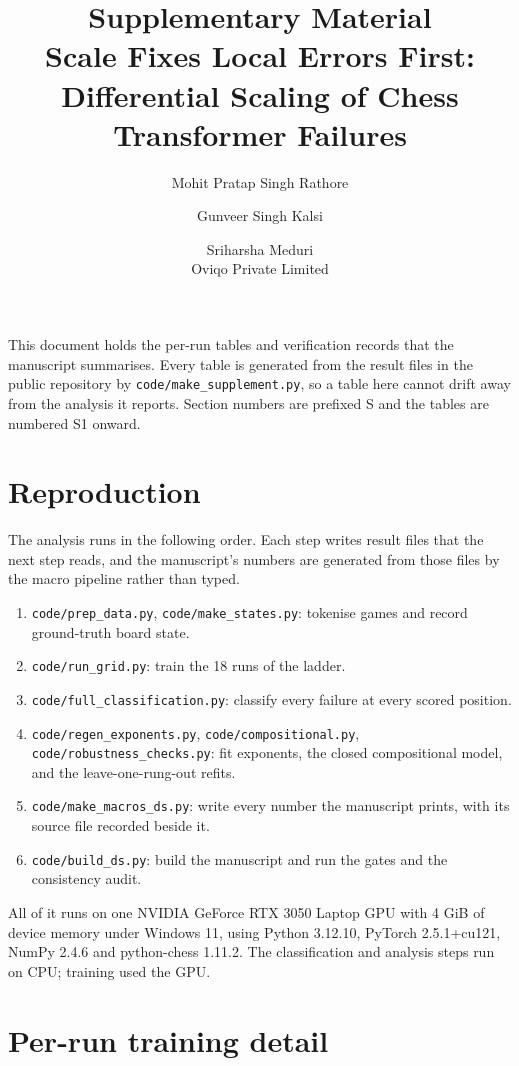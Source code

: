 \documentclass[11pt]{article}
\title{\bf Supplementary Material\\
\large Scale Fixes Local Errors First: Differential Scaling of Chess Transformer Failures}
\author{Mohit Pratap Singh Rathore \and Gunveer Singh Kalsi \and Sriharsha Meduri\\ \small Oviqo Private Limited}
\date{}
\begin{document}
\maketitle

This document holds the per-run tables and verification records that the
manuscript summarises. Every table is generated from the result files in the
public repository by \texttt{code/make\_supplement.py}, so a table here cannot
drift away from the analysis it reports. Section numbers are prefixed S and the
tables are numbered S1 onward.

\section{Reproduction}

The analysis runs in the following order. Each step writes result files that
the next step reads, and the manuscript's numbers are generated from those
files by the macro pipeline rather than typed.

\begin{enumerate}
\item \texttt{code/prep\_data.py}, \texttt{code/make\_states.py}: tokenise games and record ground-truth board state.
\item \texttt{code/run\_grid.py}: train the 18 runs of the ladder.
\item \texttt{code/full\_classification.py}: classify every failure at every scored position.
\item \texttt{code/regen\_exponents.py}, \texttt{code/compositional.py}, \texttt{code/robustness\_checks.py}: fit exponents, the closed compositional model, and the leave-one-rung-out refits.
\item \texttt{code/make\_macros\_ds.py}: write every number the manuscript prints, with its source file recorded beside it.
\item \texttt{code/build\_ds.py}: build the manuscript and run the gates and the consistency audit.
\end{enumerate}

All of it runs on one NVIDIA GeForce RTX 3050 Laptop GPU with 4 GiB of device memory under Windows 11, using Python 3.12.10, PyTorch 2.5.1+cu121, NumPy 2.4.6 and python-chess 1.11.2. The classification and analysis steps run on CPU; training used the GPU.

\section{Per-run training detail}
\end{document}
